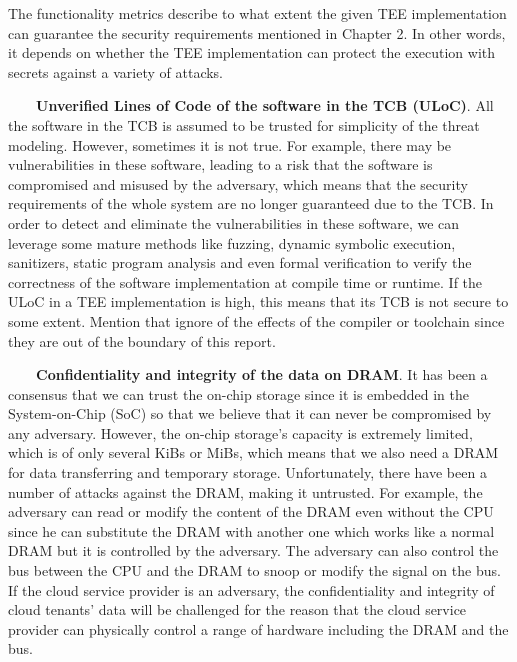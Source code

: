 \documentclass[12pt,twoside]{report}
\begin{document}
The functionality metrics describe to what extent the given TEE implementation can guarantee the security requirements mentioned in Chapter 2. In other words, it depends on whether the TEE implementation can protect the execution with secrets against a variety of attacks.

\ \ \ \ \textbf{Unverified Lines of Code of the software in the TCB (ULoC)}. All the software in the TCB is assumed to be trusted for simplicity of the threat modeling. However, sometimes it is not true. For example, there may be vulnerabilities in these software, leading to a risk that the software is compromised and misused by the adversary, which means that the security requirements of the whole system are no longer guaranteed due to the TCB. In order to detect and eliminate the vulnerabilities in these software, we can leverage some mature methods like fuzzing, dynamic symbolic execution, sanitizers, static program analysis and even formal verification to verify the correctness of the software implementation at compile time or runtime. If the ULoC in a TEE implementation is high, this means that its TCB is not secure to some extent. Mention that ignore of the effects of the compiler or toolchain since they are out of the boundary of this report.

\ \ \ \ \textbf{Confidentiality and integrity of the data on DRAM}. It has been a consensus that we can trust the on-chip storage since it is embedded in the System-on-Chip (SoC) so that we believe that it can never be compromised by any adversary. However, the on-chip storage's capacity is extremely limited, which is of only several KiBs or MiBs, which means that we also need a DRAM for data transferring and temporary storage. Unfortunately, there have been a number of attacks against the DRAM, making it untrusted. For example, the adversary can read or modify the content of the DRAM even without the CPU since he can substitute the DRAM with another one which works like a normal DRAM but it is controlled by the adversary. The adversary can also control the bus between the CPU and the DRAM to snoop or modify the signal on the bus. If the cloud service provider is an adversary, the confidentiality and integrity of cloud tenants' data will be challenged for the reason that the cloud service provider can physically control a range of hardware including the DRAM and the bus.
\end{document}
